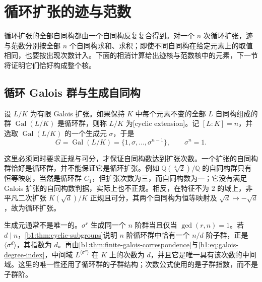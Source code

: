 
\section{循环扩张的迹与范数}
\label{b1:sec:2001}

循环扩张的全部自同构都由一个自同构反复复合得到。对一个 \(n\) 次循环扩张，迹与范数分别按全部 \(n\) 个自同构求和、求积；即使不同自同构在给定元素上的取值相同，也要按出现次数计入。下面的相消计算给出迹核与范数核中的元素，下一节将证明它们恰好构成整个核。

%
%

\subsection{循环 Galois 群与生成自同构}
\label{b1:subsec:2001:01}

\begin{definition}\label{b1:def:cyclic-extension}
	设 \(L/K\) 为有限 Galois 扩张。如果保持 \(K\) 中每个元素不变的全部 \(L\) 自同构组成的群 \(\operatorname{Gal}(L/K)\) 是循环群，则称 \(L/K\) 为[cyclic extension]。记 \([L:K]=n\)，并选取 \(\operatorname{Gal}(L/K)\) 的一个生成元 \(\sigma\)，于是
	\[
		G=\operatorname{Gal}(L/K)=\{1,\sigma,\ldots,\sigma^{n-1}\}, \qquad \sigma^n=1.
	\]
\end{definition}

这里必须同时要求正规与可分，才保证自同构数达到扩张次数。一个扩张的自同构群恰好是循环群，并不能保证它是循环扩张。例如 \(\mathbb Q(\sqrt[3]{2})/\mathbb Q\) 的自同构群只有恒等映射，当然是循环群 \(C_1\)，但扩张次数为三，而自同构数为一；它没有满足 Galois 扩张的自同构数判据，实际上也不正规。相反，在特征不为 \(2\) 的域上，非平凡二次扩张 \(K(\sqrt d)/K\) 正规且可分，其两个自同构为恒等映射及 \(\sqrt d\mapsto-\sqrt d\)，故为循环扩张。

\ProseParagraphBreak
生成元通常不是唯一的。\(\sigma^r\) 生成同一个 \(n\) 阶群当且仅当 \(\gcd(r,n)=1\)。若 \(d\mid n\)，\cref{b1:thm:cyclic-subgroups}说明 \(n\) 阶循环群中恰有一个 \(n/d\) 阶子群，正是 \(\langle\sigma^d\rangle\)，其指数为 \(d\)。再由\cref{b1:thm:finite-galois-correspondence}与\eqref{b1:eq:galois-degree-index}，中间域 \(L^{\langle\sigma^d\rangle}\) 在 \(K\) 上的次数为 \(d\)，并且它是唯一具有该次数的中间域。这里的唯一性还用了循环群的子群结构；次数公式使用的是子群指数，而不是子群阶。

